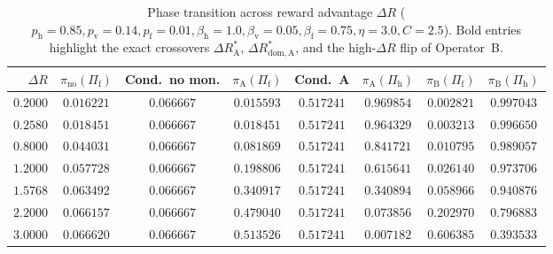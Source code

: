 \documentclass[11pt,a4paper]{article}
\begin{document}
\begin{table}[ht]
\centering
\caption{Phase transition across reward advantage $\Delta R$ ($p_{\mathrm{h}}=0.85, p_{\mathrm{v}}=0.14, p_{\mathrm{f}}=0.01, \beta_{\mathrm{h}}=1.0, \beta_{\mathrm{v}}=0.05, \beta_{\mathrm{f}}=0.75, \eta=3.0, C=2.5$). Bold entries highlight the exact crossovers $\Delta R_{\mathrm{A}}^*$, $\Delta R_{\mathrm{dom, A}}^*$, and the high-$\Delta R$ flip of Operator~B.}
\label{tab:deltaR}
\small
\begin{tabular}{@{}rccccccc@{}}
\toprule
$\Delta R$ & $\pi_{\mathrm{no}}(\Pi_{\mathrm{f}})$ & Cond.\ no mon. & $\pi_{\mathrm{A}}(\Pi_{\mathrm{f}})$ & Cond.\ A & $\pi_{\mathrm{A}}(\Pi_{\mathrm{h}})$ & $\pi_{\mathrm{B}}(\Pi_{\mathrm{f}})$ & $\pi_{\mathrm{B}}(\Pi_{\mathrm{h}})$ \\
\midrule
$0.2000$ & $0.016221$ & $0.066667$ & $0.015593$ & $0.517241$ & $0.969854$ & $0.002821$ & $0.997043$ \\
$\mathbf{0.2580}$ & $\mathbf{0.018451}$ & $0.066667$ & $\mathbf{0.018451}$ & $0.517241$ & $0.964329$ & $0.003213$ & $0.996650$ \\
$0.8000$ & $0.044031$ & $0.066667$ & $0.081869$ & $0.517241$ & $0.841721$ & $0.010795$ & $0.989057$ \\
$1.2000$ & $0.057728$ & $0.066667$ & $0.198806$ & $0.517241$ & $0.615641$ & $0.026140$ & $0.973706$ \\
$\mathbf{1.5768}$ & $0.063492$ & $0.066667$ & $\mathbf{0.340917}$ & $0.517241$ & $\mathbf{0.340894}$ & $0.058966$ & $0.940876$ \\
$2.2000$ & $0.066157$ & $0.066667$ & $0.479040$ & $0.517241$ & $0.073856$ & $0.202970$ & $0.796883$ \\
$3.0000$ & $0.066620$ & $0.066667$ & $0.513526$ & $0.517241$ & $0.007182$ & $\mathbf{0.606385}$ & $0.393533$ \\
\bottomrule
\end{tabular}
\end{table}
\end{document}
